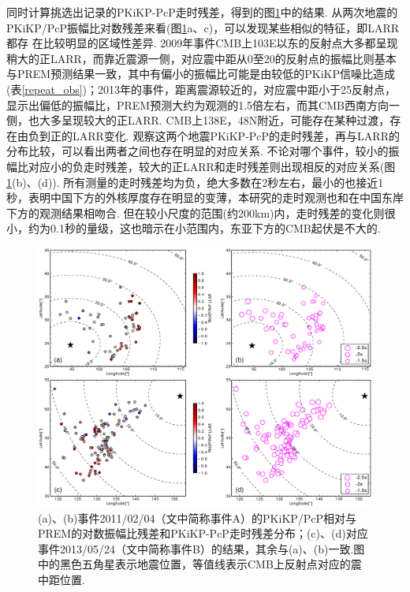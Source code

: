 同时计算挑选出记录的PKiKP-PcP走时残差，得到的图\ref{fig:bp_amp_res}中的结果. 从两次地震的PKiKP/PcP振幅比对数残差来看(图\ref{fig:bp_amp_res}a、c)，可以发现某些相似的特征，即LARR都存
在比较明显的区域性差异. 2009年事件CMB上103{\textdegree}E以东的反射点大多都呈现稍大的正LARR，而靠近震源一侧，对应震中距从0至20{\textdegree}的反射点的振幅比则基本与PREM预测结果一致，其中有偏小的振幅比可能是由较低的PKiKP信噪比造成(表\ref{repeat_obs})；2013年的事件，距离震源较近的，对应震中距小于25{\textdegree}反射点，显示出偏低的振幅比，PREM预测大约为观测的1.5倍左右，而其CMB西南方向一侧，也大多呈现较大的正LARR. CMB上138{\textdegree}E，48{\textdegree}N附近，可能存在某种过渡，存在由负到正的LARR变化. 观察这两个地震PKiKP-PcP的走时残差，再与LARR的分布比较，可以看出两者之间也存在明显的对应关系. 不论对哪个事件，较小的振幅比对应小的负走时残差，较大的正LARR和走时残差则出现相反的对应关系(图\ref{fig:bp_amp_res}(b)、(d)). 所有测量的走时残差均为负，绝大多数在2秒左右，最小的也接近1秒，表明中国下方的外核厚度存在明显的变薄，本研究的走时观测也和\citet{Shen2016a}在中国东岸下方的观测结果相吻合. 但在较小尺度的范围(约200km)内，走时残差的变化则很小，约为0.1秒的量级，这也暗示在小范围内，东亚下方的CMB起伏是不大的.

\begin{figure}[ht]
\centering
\includegraphics[width=\linewidth]{fig/chap4/bp_amp_res}
\caption{(a)、(b)事件2011/02/04（文中简称事件A）的PKiKP/PcP相对与PREM的对数振幅比残差和PKiKP-PcP走时残差分布；(c)、(d)对应事件2013/05/24（文中简称事件B）的结果，其余与(a)、(b)一致.图中的黑色五角星表示地震位置，等值线表示CMB上反射点对应的震中距位置.}
\label{fig:bp_amp_res}
\end{figure}

